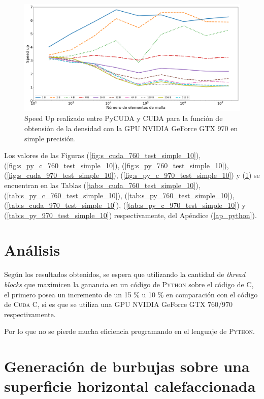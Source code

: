 \begin{figure}[htbp]
	\centering
	\includegraphics[width=\textwidth]{figs/cap4/s_py_970_test_simple_10}
	\caption{Speed Up realizado entre PyCUDA y CUDA para la función de obtensión de la densidad con la GPU NVIDIA GeForce GTX 970 en simple precisión.} 
	\label{fig:s_py_970_test_simple_10}	
\end{figure}

Los valores de las Figuras (\ref{fig:s_cuda_760_test_simple_10}), (\ref{fig:s_py_c_760_test_simple_10}), (\ref{fig:s_py_760_test_simple_10}), (\ref{fig:s_cuda_970_test_simple_10}), (\ref{fig:s_py_c_970_test_simple_10}) y (\ref{fig:s_py_970_test_simple_10}) se encuentran en las Tablas (\ref{tab:s_cuda_760_test_simple_10}), (\ref{tab:s_py_c_760_test_simple_10}), (\ref{tab:s_py_760_test_simple_10}), (\ref{tab:s_cuda_970_test_simple_10}), (\ref{tab:s_py_c_970_test_simple_10}) y (\ref{tab:s_py_970_test_simple_10}) respectivamente, del Apéndice (\ref{ap_python}).
\section{Análisis}

Según los resultados obtenidos, se espera que utilizando la cantidad de \textit{thread blocks} que maximicen la ganancia en un código de \textsc{Python} sobre el código de \textsc{C}, el primero posea un incremento de un  15 \%  u 10 \% en comparación con el código de \textsc{Cuda C}, si es que se utiliza una GPU NVIDIA GeForce GTX 760/970 respectivamente.

Por lo que no se pierde mucha eficiencia programando en el lenguaje de \textsc{Python}.


\section{Generación de burbujas sobre una superficie horizontal calefaccionada}

